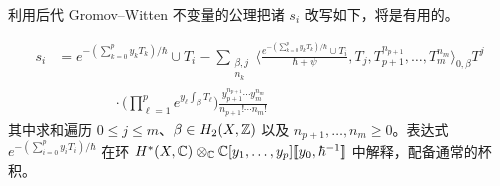 
利用后代 Gromov–Witten 不变量的公理把诸 $s_i$ 改写如下，将是有用的。

\begin{proposition}
\begin{align*}
s_i &= e^{-(\sum_{k=0}^p y_kT_k)/\hbar}\cup T_i-\sum_{\substack{\beta,j\\n_k}}\Big\langle\frac{e^{-(\sum_{k=0}^p y_kT_k)/\hbar}\cup T_i}{\hbar+\psi},T_j,T_{p+1}^{n_{p+1}},\dots,T_m^{n_m}\Big\rangle_{0,\beta}T^j\\
&\qquad\qquad\cdot\Big(\prod_{\ell=1}^p e^{y_\ell\int_\beta T_\ell}\Big)\frac{y_{p+1}^{n_{p+1}}\cdots y_m^{n_m}}{n_{p+1}!\cdots n_m!}
\end{align*}
其中求和遍历 $0\le j\le m$、$\beta\in H_2(X,\mathbb{Z})$ 以及 $n_{p+1},\dots,n_m\ge0$。表达式 $e^{-(\sum_{i=0}^p y_iT_i)/\hbar}$ 在环 $H^*(X,\mathbb{C})\otimes_{\mathbb{C}}\mathbb{C}[y_1,\dots,y_p][\![y_0,\hbar^{-1}]\!]$ 中解释，配备通常的杯积。
\end{proposition}


